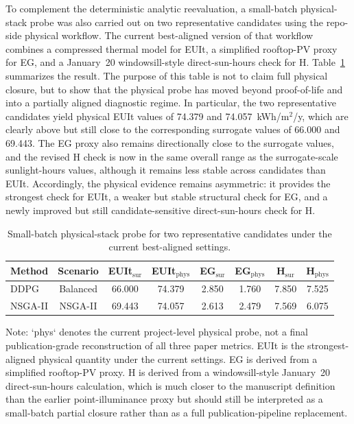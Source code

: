 To complement the deterministic analytic reevaluation, a small-batch physical-stack probe was also carried out on two representative candidates using the repo-side physical workflow. The current best-aligned version of that workflow combines a compressed thermal model for EUIt, a simplified rooftop-PV proxy for EG, and a January~20 windowsill-style direct-sun-hours check for H. Table~\ref{tab:supp_physprobe} summarizes the result. The purpose of this table is not to claim full physical closure, but to show that the physical probe has moved beyond proof-of-life and into a partially aligned diagnostic regime. In particular, the two representative candidates yield physical EUIt values of 74.379 and 74.057~kWh/m$^2$/y, which are clearly above but still close to the corresponding surrogate values of 66.000 and 69.443. The EG proxy also remains directionally close to the surrogate values, and the revised H check is now in the same overall range as the surrogate-scale sunlight-hours values, although it remains less stable across candidates than EUIt. Accordingly, the physical evidence remains asymmetric: it provides the strongest check for EUIt, a weaker but stable structural check for EG, and a newly improved but still candidate-sensitive direct-sun-hours check for H.

\begin{table}[H]
\centering
\caption{Small-batch physical-stack probe for two representative candidates under the current best-aligned settings.}
\label{tab:supp_physprobe}
\begin{threeparttable}
\footnotesize
\begin{tabular*}{\linewidth}{@{\extracolsep{\fill}}lccccccc@{}}
\toprule
Method & Scenario & EUIt$_\mathrm{sur}$ & EUIt$_\mathrm{phys}$ & EG$_\mathrm{sur}$ & EG$_\mathrm{phys}$ & H$_\mathrm{sur}$ & H$_\mathrm{phys}$ \\
\midrule
DDPG & Balanced & 66.000 & 74.379 & 2.850 & 1.760 & 7.850 & 7.525 \\
NSGA-II & NSGA-II & 69.443 & 74.057 & 2.613 & 2.479 & 7.569 & 6.075 \\
\bottomrule
\end{tabular*}
\begin{tablenotes}[flushleft]
\footnotesize
\item Note: `phys` denotes the current project-level physical probe, not a final publication-grade reconstruction of all three paper metrics. EUIt is the strongest-aligned physical quantity under the current settings. EG is derived from a simplified rooftop-PV proxy. H is derived from a windowsill-style January~20 direct-sun-hours calculation, which is much closer to the manuscript definition than the earlier point-illuminance proxy but should still be interpreted as a small-batch partial closure rather than as a full publication-pipeline replacement.
\end{tablenotes}
\end{threeparttable}
\end{table}

